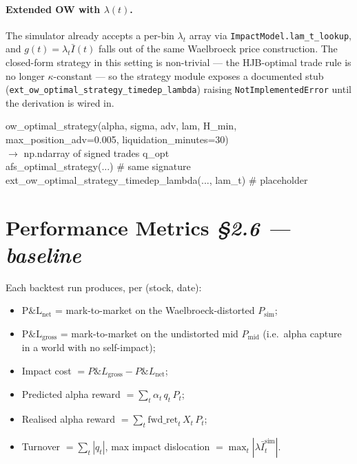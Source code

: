 \documentclass[11pt,a4paper]{article}
\begin{document}
\paragraph{Extended OW with $\lambda(t)$.}  The simulator already accepts
a per-bin $\lambda_t$ array via \texttt{ImpactModel.lam\_t\_lookup}, and
$g(t) = \lambda_t\bar I(t)$ falls out of the same Waelbroeck price
construction.  The closed-form strategy in this setting is non-trivial
--- the HJB-optimal trade rule is no longer $\kappa$-constant ---
so the strategy module exposes a documented stub
(\texttt{ext\_ow\_optimal\_strategy\_timedep\_lambda}) raising
\texttt{NotImplementedError} until the derivation is wired in.

\begin{sigbox}
\noindent
ow\_optimal\_strategy(alpha, sigma, adv, lam, H\_min,\\
\hspace*{8em}max\_position\_adv=0.005, liquidation\_minutes=30)\\
\hspace*{1em}$\rightarrow$ np.ndarray of signed trades q\_opt \\[2pt]
afs\_optimal\_strategy(...)  \# same signature \\[2pt]
ext\_ow\_optimal\_strategy\_timedep\_lambda(..., lam\_t)  \# placeholder
\end{sigbox}

\section{Performance Metrics \hfill \normalsize\itshape \S2.6 --- baseline}
\label{sec:perf}

Each backtest run produces, per (stock, date):
\begin{itemize}
  \item $\mathrm{P\&L}_{\text{net}}$ = mark-to-market on the
        Waelbroeck-distorted $P_{\text{sim}}$;
  \item $\mathrm{P\&L}_{\text{gross}}$ = mark-to-market on the
        undistorted mid $P_{\text{mid}}$ (i.e.\ alpha capture in a
        world with no self-impact);
  \item Impact cost $= P\&L_{\text{gross}} - P\&L_{\text{net}}$;
  \item Predicted alpha reward $= \sum_t \alpha_t\,q_t\,P_t$;
  \item Realised alpha reward $= \sum_t \mathrm{fwd\_ret}_t\,X_t\,P_t$;
  \item Turnover $= \sum_t |q_t|$, max impact dislocation
        $= \max_t |\lambda\bar I^{\text{sim}}_t|$.
\end{itemize}
\end{document}
